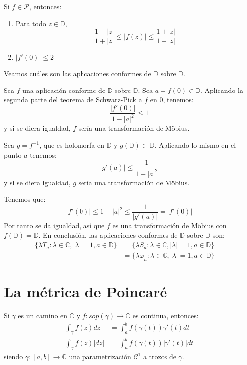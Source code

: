 \begin{theorem}
    Si $f \in \mathcal{P}$, entonces:
    \begin{enumerate}
        \item Para todo $z \in \mathbb{D}$,
              $$\frac{1-|z|}{1+|z|} \leq |f(z)| \leq \frac{1+|z|}{1-|z|}$$
        \item $|f'(0)| \leq 2$
    \end{enumerate}
\end{theorem}

Veamos cuáles son las aplicaciones conformes de $\mathbb{D}$ sobre $\mathbb{D}$.

Sea $f$ una aplicación conforme de $\mathbb{D}$ sobre $\mathbb{D}$.
Sea $a = f(0) \in \mathbb{D}$.
Aplicando la segunda parte del teorema de Schwarz-Pick a $f$ en 0, tenemos:
$$\frac{|f'(0)|}{1-|a|^2} \leq 1$$
y si se diera igualdad, $f$ sería una transformación de Möbius.

Sea $g = f^{-1}$, que es holomorfa en $\mathbb{D}$ y $g(\mathbb{D}) \subset \mathbb{D}$.
Aplicando lo mismo en el punto $a$ tenemos:
$$|g'(a)| \leq \frac{1}{1-|a|^2}$$
y si se diera igualdad, $g$ sería una transformación de Möbius.

Tenemos que:
$$|f'(0)| \leq 1-|a|^2 \leq \frac{1}{|g'(a)|} = |f'(0)|$$
Por tanto se da igualdad, así que $f$ es una transformación de Möbius con $f(\mathbb{D}) = \mathbb{D}$.
En conclusión, las aplicaciones conformes de $\mathbb{D}$ sobre $\mathbb{D}$ son:
\begin{align*}
    \{\lambda T_a : \lambda \in \mathbb{C}, |\lambda| = 1, a \in \mathbb{D}\} & = \{\lambda S_a : \lambda \in \mathbb{C}, |\lambda| = 1, a \in \mathbb{D}\} =     \\
                                                                              & = \{\lambda \varphi_a : \lambda \in \mathbb{C}, |\lambda| = 1, a \in \mathbb{D}\}
\end{align*}

\section{La métrica de Poincaré}
Si $\gamma$ es un camino en $\mathbb{C}$ y $f: sop(\gamma) \to \mathbb{C}$ es continua, entonces:
\begin{align*}
    \int_\gamma f(z)dz   & = \int_a^b f(\gamma(t))\gamma'(t)dt   \\
    \int_\gamma f(z)|dz| & = \int_a^b f(\gamma(t))|\gamma'(t)|dt
\end{align*}
siendo $\gamma: [a, b] \to \mathbb{C}$ una parametrización $\mathcal{C}^1$ a trozos de $\gamma$.


